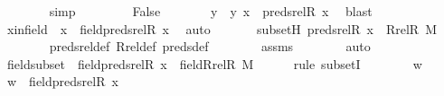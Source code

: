 \begin{isabellebody}
\ \ \ \ \ \ \isamarkupfalse%
\ simp\isanewline
\ \ \isamarkupfalse%
\isanewline
\ \ \ \ \isamarkupfalse%
\ False\isanewline
\ \ \ \ \isamarkupfalse%
\ \isamarkupfalse%
\ y\ \ {\isachardoublequoteopen}{\isacharless}{\kern0pt}y{\isacharcomma}{\kern0pt}\ x{\isachargreater}{\kern0pt}\ {\isasymin}\ preds{\isacharunderscore}{\kern0pt}rel{\isacharparenleft}{\kern0pt}R{\isacharcomma}{\kern0pt}\ x{\isacharparenright}{\kern0pt}{\isachardoublequoteclose}\ \isamarkupfalse%
\ blast\ \isanewline
\ \ \ \ \isamarkupfalse%
\ \isamarkupfalse%
\ xinfield\ {\isacharcolon}{\kern0pt}\ {\isachardoublequoteopen}x\ {\isasymin}\ field{\isacharparenleft}{\kern0pt}preds{\isacharunderscore}{\kern0pt}rel{\isacharparenleft}{\kern0pt}R{\isacharcomma}{\kern0pt}\ x{\isacharparenright}{\kern0pt}{\isacharparenright}{\kern0pt}{\isachardoublequoteclose}\ \isamarkupfalse%
\ auto\ \isanewline
\isanewline
\ \ \ \ \isamarkupfalse%
\ subsetH{\isacharcolon}{\kern0pt}\ {\isachardoublequoteopen}preds{\isacharunderscore}{\kern0pt}rel{\isacharparenleft}{\kern0pt}R{\isacharcomma}{\kern0pt}\ x{\isacharparenright}{\kern0pt}\ {\isasymsubseteq}\ Rrel{\isacharparenleft}{\kern0pt}R{\isacharcomma}{\kern0pt}\ M{\isacharparenright}{\kern0pt}{\isachardoublequoteclose}\ \isanewline
\ \ \ \ \ \ \isamarkupfalse%
\ preds{\isacharunderscore}{\kern0pt}rel{\isacharunderscore}{\kern0pt}def\ Rrel{\isacharunderscore}{\kern0pt}def\ preds{\isacharunderscore}{\kern0pt}def\isanewline
\ \ \ \ \ \ \isamarkupfalse%
\ assms\isanewline
\ \ \ \ \ \ \isamarkupfalse%
\ auto\isanewline
\isanewline
\ \ \ \ \isamarkupfalse%
\ fieldsubset\ {\isacharcolon}{\kern0pt}\ {\isachardoublequoteopen}field{\isacharparenleft}{\kern0pt}preds{\isacharunderscore}{\kern0pt}rel{\isacharparenleft}{\kern0pt}R{\isacharcomma}{\kern0pt}\ x{\isacharparenright}{\kern0pt}{\isacharparenright}{\kern0pt}\ {\isasymsubseteq}\ field{\isacharparenleft}{\kern0pt}Rrel{\isacharparenleft}{\kern0pt}R{\isacharcomma}{\kern0pt}\ M{\isacharparenright}{\kern0pt}{\isacharparenright}{\kern0pt}{\isachardoublequoteclose}\ \isanewline
\ \ \ \ \isamarkupfalse%
{\isacharparenleft}{\kern0pt}rule\ subsetI{\isacharparenright}{\kern0pt}\isanewline
\ \ \ \ \ \ \isamarkupfalse%
\ w\ \isamarkupfalse%
\ {\isachardoublequoteopen}w\ {\isasymin}\ field{\isacharparenleft}{\kern0pt}preds{\isacharunderscore}{\kern0pt}rel{\isacharparenleft}{\kern0pt}R{\isacharcomma}{\kern0pt}\ x{\isacharparenright}{\kern0pt}{\isacharparenright}{\kern0pt}{\isachardoublequoteclose}\ \isanewline

\end{isabellebody}
